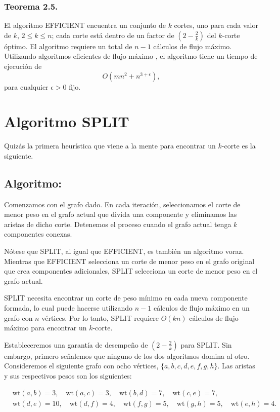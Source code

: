 \documentclass{article}
\begin{document}
\subsubsection*{Teorema 2.5.} 
El algoritmo \textsc{EFFICIENT} encuentra un conjunto de \( k \) cortes, uno para cada valor de \( k \), \( 2 \leq k \leq n \);  
cada corte está dentro de un factor de \( (2 - \frac{2}{k}) \) del \( k \)-corte óptimo.  
El algoritmo requiere un total de \( n-1 \) cálculos de flujo máximo.  
Utilizando algoritmos eficientes de flujo máximo \cite{GT, KRT}, el algoritmo tiene un tiempo de ejecución de  
\[
O(mn^2 + n^{3+\epsilon}),
\]
para cualquier \( \epsilon > 0 \) fijo.

\section{Algoritmo SPLIT}

Quizás la primera heurística que viene a la mente para encontrar un \( k \)-corte es la siguiente.

\subsection*{Algoritmo:}
Comenzamos con el grafo dado. En cada iteración, seleccionamos el corte de menor peso en el grafo actual que divida una componente y eliminamos las aristas de dicho corte. Detenemos el proceso cuando el grafo actual tenga \( k \) componentes conexas.

Nótese que SPLIT, al igual que EFFICIENT, es también un algoritmo voraz. Mientras que EFFICIENT selecciona un corte de menor peso en el grafo original que crea componentes adicionales, SPLIT selecciona un corte de menor peso en el grafo actual.

SPLIT necesita encontrar un corte de peso mínimo en cada nueva componente formada, lo cual puede hacerse utilizando \( n - 1 \) cálculos de flujo máximo en un grafo con \( n \) vértices. Por lo tanto, SPLIT requiere \( O(kn) \) cálculos de flujo máximo para encontrar un \( k \)-corte.

Estableceremos una garantía de desempeño de \( (2 - \frac{2}{k}) \) para SPLIT. Sin embargo, primero señalemos que ninguno de los dos algoritmos domina al otro. Consideremos el siguiente grafo con ocho vértices, \( \{a, b, c, d, e, f, g, h\} \). Las aristas y sus respectivos pesos son los siguientes:

\[
\begin{aligned}
    &\text{wt}(a, b) = 3, \quad
    \text{wt}(a, c) = 3, \quad
    \text{wt}(b, d) = 7, \quad
    \text{wt}(c, e) = 7, \quad \\
    &\text{wt}(d, e) = 10, \quad
    \text{wt}(d, f) = 4, \quad
    \text{wt}(f, g) = 5, \quad
    \text{wt}(g, h) = 5, \quad
    \text{wt}(e, h) = 4.
\end{aligned}
\]
\end{document}
